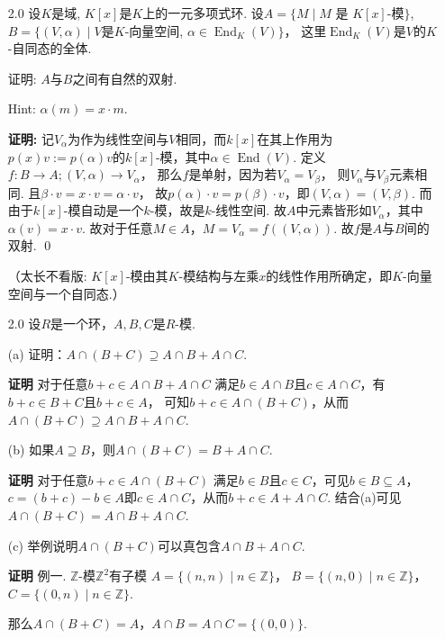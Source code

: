 \begin{enumerate}
    \item[2.0]
        设$K$是域, $K[x]$是$K$上的一元多项式环. 
        设$A=\{M\mid M\text{ 是 }K[x]\text{-模}\}$, 
        $B=\{(V,\alpha)\mid V$是$K$-向量空间, 
        $\alpha\in \operatorname{End}_K(V)\}$，
        这里$\operatorname{End}_K(V)$是$V$的$K$-自同态的全体.\par
        证明: $A$与$B$之间有自然的双射.\par
        Hint: $\alpha(m)=x\cdot m$.
    \item[\textbf{证明:}]
        记$V_{\alpha}$为作为线性空间与$V$相同，而$k[x]$在其上作用为
        $p(x)v:=p(\alpha)v$的$k[x]$-模，其中$\alpha \in \operatorname{End}(V)$. 
        定义$f:B \rightarrow A; (V,\alpha) \rightarrow V_{\alpha}$，
        那么$f$是单射，因为若$V_{\alpha} = V_{\beta}$，
        则$V_{\alpha}$与$V_{\beta}$元素相同.
        且$\beta \cdot v = x \cdot v = \alpha \cdot v$，
        故$p(\alpha) \cdot v = p(\beta) \cdot v$，即$(V,\alpha)=(V,\beta)$. 
        而 由于$k[x]$-模自动是一个$k$-模，故是$k$-线性空间. 
        故$A$中元素皆形如$V_{\alpha}$，其中$\alpha(v) = x \cdot v$. 
        故对于任意$M \in A$，$M = V_{\alpha} = f((V,\alpha))$. 
        故$f$是$A$与$B$间的双射. \qed

        （太长不看版:
        $K[x]$-模由其$K$-模结构与左乘$x$的线性作用所确定，即$K$-向量空间与一个自同态.）

    \item[2.0]
        设$R$是一个环，$A,B,C$是$R$-模.
    \item[(a)]证明：$A\cap(B+C)\supseteq A \cap B + A \cap C$.
    \item[\textbf{证明}] 对于任意$b+c \in A\cap B+A\cap C$
        满足$b \in A\cap B$且$c \in A\cap C$，有$b+c\in B+C$且$b+c \in A$，
        可知$b+c \in A \cap(B+C)$，从而$A\cap(B+C)\supseteq A\cap B+A\cap C$.
    \item[(b)]如果$A \supseteq B$，则$A \cap(B+C)=B+A\cap C$.
    \item[\textbf{证明}]对于任意$b+c \in A\cap(B+C)$
        满足$b \in B$且$c \in C$，可见$b \in B \subseteq A$，
        $c=(b+c)-b \in A$即$c \in A \cap C$，从而$b+c \in A+A\cap C$. 
        结合(a)可见$A\cap(B+C)=A\cap B+A\cap C$.
    \item[(c)]举例说明$A \cap(B+C)$可以真包含$A\cap B+A\cap C$.
    \item[\textbf{证明}]例一. $\mathbb{Z}$-模$\mathbb{Z}^2$有子模
        $A=\{(n,n)\mid n \in \mathbb{Z}\}$，
        $B=\{(n,0)\mid n \in \mathbb{Z}\}$，
        $C=\{(0,n)\mid n \in \mathbb{Z}\}$.\par
        那么$A\cap(B+C)=A$，$A\cap B=A\cap C=\{(0,0)\}$.


\end{enumerate}
